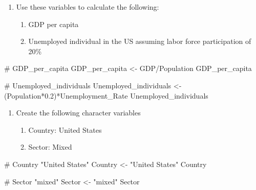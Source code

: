 \documentclass[
  letterpaper,
  DIV=11,
  numbers=noendperiod]{scrartcl}
\newenvironment{Shaded}{\begin{snugshade}}{\end{snugshade}}
\newcommand{\CommentTok}[1]{\textcolor[rgb]{0.37,0.37,0.37}{#1}}
\newcommand{\FloatTok}[1]{\textcolor[rgb]{0.68,0.00,0.00}{#1}}
\newcommand{\NormalTok}[1]{\textcolor[rgb]{0.00,0.23,0.31}{#1}}
\newcommand{\OtherTok}[1]{\textcolor[rgb]{0.00,0.23,0.31}{#1}}
\newcommand{\SpecialCharTok}[1]{\textcolor[rgb]{0.37,0.37,0.37}{#1}}
\newcommand{\StringTok}[1]{\textcolor[rgb]{0.13,0.47,0.30}{#1}}
\providecommand{\tightlist}{%
  \setlength{\itemsep}{0pt}\setlength{\parskip}{0pt}}\usepackage{longtable,booktabs,array}
\begin{document}
\begin{enumerate}
\def\labelenumi{\arabic{enumi}.}
\setcounter{enumi}{1}
\tightlist
\item
  Use these variables to calculate the following:

  \begin{enumerate}
  \def\labelenumii{\alph{enumii}.}
  \tightlist
  \item
    GDP per capita
  \item
    Unemployed individual in the US assuming labor force participation
    of 20\%
  \end{enumerate}
\end{enumerate}

\begin{Shaded}
\begin{Highlighting}[]
\CommentTok{\# GDP\_per\_capita}
\NormalTok{GDP\_per\_capita }\OtherTok{\textless{}{-}}\NormalTok{ GDP}\SpecialCharTok{/}\NormalTok{Population}
\NormalTok{GDP\_per\_capita    }

\CommentTok{\# Unemployed\_individuals}
\NormalTok{Unemployed\_individuals }\OtherTok{\textless{}{-}}\NormalTok{ (Population}\SpecialCharTok{*}\FloatTok{0.2}\NormalTok{)}\SpecialCharTok{*}\NormalTok{Unemployment\_Rate}
\NormalTok{Unemployed\_individuals}
\end{Highlighting}
\end{Shaded}

\begin{enumerate}
\def\labelenumi{\arabic{enumi}.}
\setcounter{enumi}{2}
\tightlist
\item
  Create the following character variables

  \begin{enumerate}
  \def\labelenumii{\alph{enumii}.}
  \tightlist
  \item
    Country: United States
  \item
    Sector: Mixed
  \end{enumerate}
\end{enumerate}

\begin{Shaded}
\begin{Highlighting}[]
\CommentTok{\# Country "United States"}
\NormalTok{Country }\OtherTok{\textless{}{-}} \StringTok{"United States"}
\NormalTok{Country }

\CommentTok{\# Sector "mixed"}
\NormalTok{Sector }\OtherTok{\textless{}{-}} \StringTok{"mixed"}
\NormalTok{Sector}
\end{Highlighting}
\end{Shaded}
\end{document}
